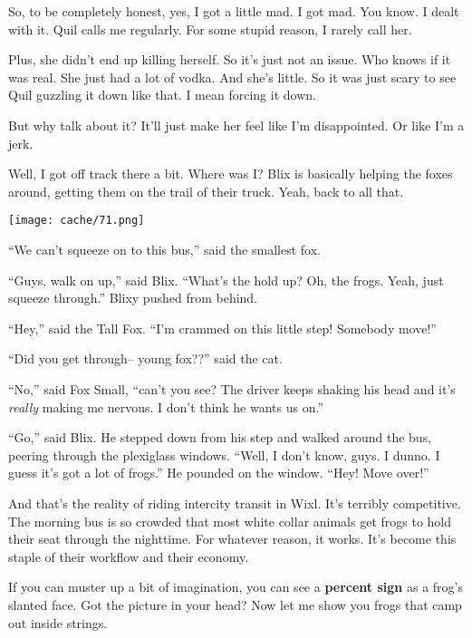 \documentclass[12pt,twoside]{report}
\begin{document}
So, to be completely honest, yes, I got a little mad.  I got mad.  You
know.  I dealt with it. Quil calls me regularly.  For some stupid
reason, I rarely call her.

Plus, she didn't end up killing herself.  So it's just not an issue.
Who knows if it was real. She just had a lot of vodka.  And she's
little.  So it was just scary to see Quil guzzling it down like
that. I mean forcing it down.

But why talk about it?  It'll just make her feel like I'm
disappointed.  Or like I'm a jerk.

Well, I got off track there a bit.  Where was I?  Blix is basically
helping the foxes around, getting them on the trail of their truck.
Yeah, back to all that.

	\texttt{[image: cache/71.png]}

``We can't squeeze on to this bus,'' said the smallest fox.

``Guys, walk on up,'' said Blix.  ``What's the hold up?  Oh, the
        frogs.  Yeah, just squeeze through.'' Blixy pushed from
        behind.

``Hey,'' said the Tall Fox.  ``I'm crammed on this little step!
        Somebody move!''

``Did you get through-- young fox??'' said the cat.

``No,'' said Fox Small, ``can't you see?  The driver keeps shaking his
        head and it's {\em really} making me nervous.  I don't think
        he wants us on.''

``Go,'' said Blix.  He stepped down from his step and walked around
        the bus, peering through the plexiglass windows.  ``Well, I
        don't know, guys.  I dunno.  I guess it's got a lot of
        frogs.''  He pounded on the window.  ``Hey!  Move over!''

And that's the reality of riding intercity transit in Wixl.  It's
terribly competitive.  The morning bus is so crowded that most white
collar animals get frogs to hold their seat through the nighttime. For
whatever reason, it works.  It's become this staple of their workflow
and their economy.

If you can muster up a bit of imagination, you can see a {\bf percent
  sign} as a frog's slanted face. Got the picture in your head?  Now
let me show you frogs that camp out inside strings.
\end{document}
